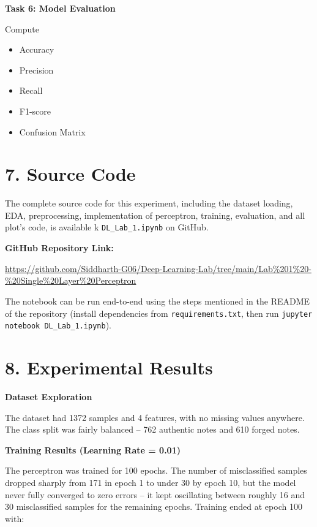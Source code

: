 \documentclass[11pt]{article}
\begin{document}
\vspace{2mm}

\textbf{Task 6: Model Evaluation}

Compute

\begin{itemize}
\item Accuracy
\item Precision
\item Recall
\item F1-score
\item Confusion Matrix
\end{itemize}


\section*{7. Source Code}

The complete source code for this experiment, including the dataset loading, EDA, preprocessing, implementation of perceptron, training, evaluation, and all plot's code, is available k \texttt{DL\_Lab\_1.ipynb} on GitHub.

\textbf{GitHub Repository Link:}

\url{https://github.com/Siddharth-G06/Deep-Learning-Lab/tree/main/Lab%201%20-%20Single%20Layer%20Perceptron}

The notebook can be run end-to-end using the steps mentioned in the README of the repository (install dependencies from \texttt{requirements.txt}, then run \texttt{jupyter notebook DL\_Lab\_1.ipynb}).

\section*{8. Experimental Results}

\textbf{Dataset Exploration}

The dataset had 1372 samples and 4 features, with no missing values anywhere. The class split was fairly balanced -- 762 authentic notes and 610 forged notes.

\vspace{2mm}

\textbf{Training Results (Learning Rate = 0.01)}

The perceptron was trained for 100 epochs. The number of misclassified samples dropped sharply from 171 in epoch 1 to under 30 by epoch 10, but the model never fully converged to zero errors -- it kept oscillating between roughly 16 and 30 misclassified samples for the remaining epochs. Training ended at epoch 100 with:
\end{document}
